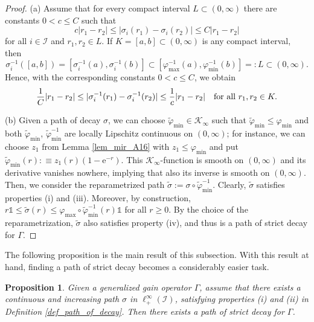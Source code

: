 \documentclass[10pt, oneside, a4paper]{article}
\newcommand{\unit}{\mathds{1}}
\newcommand{\rme}{\mathrm{e}}
\newcommand{\IC}{\mathcal{I}}
\newcommand{\KC}{\mathcal{K}}
\newtheorem{proposition}{Proposition}[section]
\begin{document}
\begin{proof}
(a) Assume that for every compact interval $L \subset (0,\infty)$ there are constants $0 < c \leq C$ such that%
\begin{equation*}
  c|r_1 - r_2| \leq |\sigma_i(r_1) - \sigma_i(r_2)| \leq C|r_1 - r_2|%
\end{equation*}
for all $i \in \IC$ and $r_1,r_2 \in L$. If $K = [a,b] \subset (0,\infty)$ is any compact interval, then%
\begin{equation*}
  \sigma_i^{-1}([a,b]) = [\sigma_i^{-1}(a),\sigma_i^{-1}(b)] \subset [\varphi_{\max}^{-1}(a),\varphi_{\min}^{-1}(b)] =: L \subset (0,\infty).%
\end{equation*}
Hence, with the corresponding constants $0 < c \leq C$, we obtain%
\begin{equation*}
  \frac{1}{C}|r_1 - r_2| \leq |\sigma_i^{-1}(r_1) - \sigma_i^{-1}(r_2)| \leq \frac{1}{c}|r_1 - r_2| \mbox{\quad for all\ } r_1,r_2 \in K.%
\end{equation*}

(b) Given a path of decay $\sigma$, we can choose $\tilde{\varphi}_{\min} \in \KC_{\infty}$ such that $\tilde{\varphi}_{\min} \leq \varphi_{\min}$ and both $\tilde{\varphi}_{\min}$, $\tilde{\varphi}_{\min}^{-1}$ are locally Lipschitz continuous on $(0,\infty)$; for instance, we can choose $z_1$ from Lemma \ref{lem_mir_A16} with $z_1 \leq \varphi_{\min}$ and put $\tilde{\varphi}_{\min}(r) :\equiv z_1(r)(1 - \rme^{-r})$. This $\KC_{\infty}$-function is smooth on $(0,\infty)$ and its derivative vanishes nowhere, implying that also its inverse is smooth on $(0,\infty)$. Then, we consider the reparametrized path $\tilde{\sigma} := \sigma \circ \tilde{\varphi}_{\min}^{-1}$. Clearly, $\tilde{\sigma}$ satisfies properties (i) and (iii). Moreover, by construction, $r\unit \leq \tilde{\sigma}(r) \leq \varphi_{\max} \circ \tilde{\varphi}_{\min}^{-1}(r)\unit$ for all $r \geq 0$. By the choice of the reparametrization, $\tilde{\sigma}$ also satisfies property (iv), and thus is a path of strict decay for $\Gamma$.
\end{proof}

The following proposition is the main result of this subsection. With this result at hand, finding a path of strict decay becomes a considerably easier task.%

\begin{proposition}\label{prop_path_of_decay_2}
Given a generalized gain operator $\Gamma$, assume that there exists a continuous and increasing path $\sigma$ in $\ell^{\infty}_+(\IC)$, satisfying properties (i) and (ii) in Definition \ref{def_path_of_decay}. Then there exists a path of strict decay for $\Gamma$.
\end{proposition}
\end{document}
